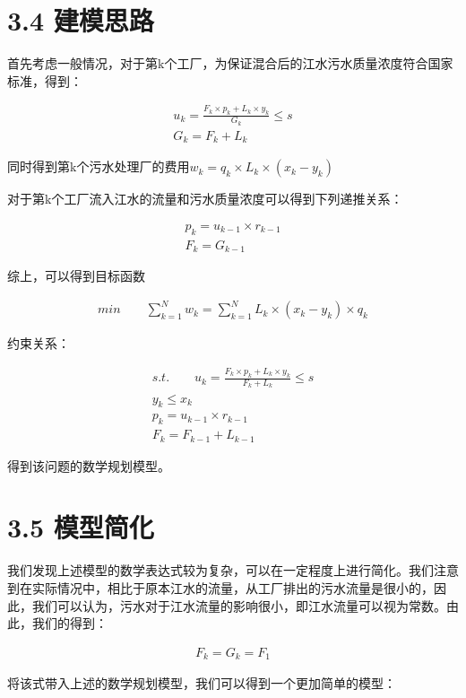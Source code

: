 \documentclass[bachelor,openany,oneside,color]{buaathesis}
\begin{document}
\hypertarget{header-n269}{%
\section{3.4 建模思路}\label{header-n269}}

首先考虑一般情况，对于第k个工厂，为保证混合后的江水污水质量浓度符合国家标准，得到：

\begin{gather*}u_k=\frac{F_k\times p_k+L_k\times y_k}{G_k}\leq s\\
G_k=F_k+L_k\end{gather*}

同时得到第k个污水处理厂的费用\(w_k=q_k\times L_k\times (x_k-y_k)\)

对于第k个工厂流入江水的流量和污水质量浓度可以得到下列递推关系：

\begin{gather*}p_k=u_{k-1}\times r_{k-1}\\
F_k=G_{k-1}\end{gather*}

综上，可以得到目标函数

\begin{gather*}min \qquad \sum_{k=1}^Nw_k=\sum_{k=1}^NL_k\times (x_k-y_k)\times q_k\end{gather*}

约束关系：

\begin{gather*}s.t. \qquad u_k=\frac{F_k\times p_k+L_k\times y_k}{F_k+L_k}\leq s\\
y_k\leq x_k\\
p_k=u_{k-1}\times r_{k-1}\\
F_k=F_{k-1}+L_{k-1}\end{gather*}

得到该问题的数学规划模型。

\hypertarget{header-n280}{%
\section{3.5 模型简化}\label{header-n280}}

我们发现上述模型的数学表达式较为复杂，可以在一定程度上进行简化。我们注意到在实际情况中，相比于原本江水的流量，从工厂排出的污水流量是很小的，因此，我们可以认为，污水对于江水流量的影响很小，即江水流量可以视为常数。由此，我们的得到：

\begin{gather*}F_k=G_k=F_1\end{gather*}

将该式带入上述的数学规划模型，我们可以得到一个更加简单的模型：
\end{document}
